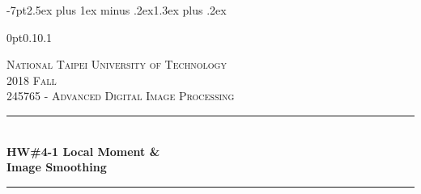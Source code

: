 \titlespacing*{\section} 
{-7pt}{2.5ex plus 1ex minus .2ex}{1.3ex plus .2ex}

\titlespacing*{\subsection}
{0pt}{0.1\baselineskip}{0.1\baselineskip}




\begin{titlepage} %
	\newcommand{\HRule}{\rule{\linewidth}{0.5mm}} %
		
	\center %
		
		
	\textsc{\LARGE National Taipei University of Technology}\\[1.5cm] %
		
	\textsc{\Large 2018 Fall}\\[0.5cm] %
		
	\textsc{\large 245765 - Advanced Digital Image Processing}\\[0.5cm] %
		
		
	\HRule\\[0.4cm]
		
	{\huge\bfseries HW\#4-1 Local Moment \&\\ Image Smoothing}\\[0.4cm] %
		
	\HRule\\[1.5cm]
		

\end{titlepage}
